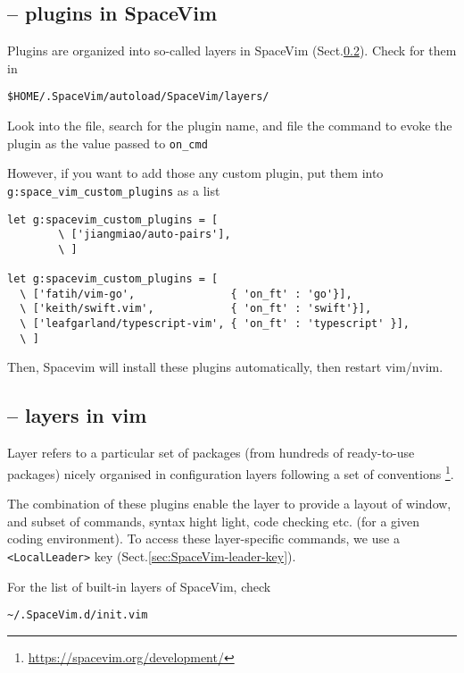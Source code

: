 \subsection{ -- plugins in SpaceVim}

Plugins are organized into so-called layers in SpaceVim
(Sect.\ref{sec:nvim-layers}). Check for them in 
\begin{verbatim}
$HOME/.SpaceVim/autoload/SpaceVim/layers/
\end{verbatim}
Look into the file, search for the plugin name, and file the command to evoke
the plugin as the value passed to \verb!on_cmd!

However, if you want to add those any custom plugin, put them into 
\verb!g:space_vim_custom_plugins! as a list
\begin{verbatim}
let g:spacevim_custom_plugins = [
        \ ['jiangmiao/auto-pairs'],
        \ ]
        
let g:spacevim_custom_plugins = [
  \ ['fatih/vim-go',               { 'on_ft' : 'go'}],
  \ ['keith/swift.vim',            { 'on_ft' : 'swift'}],
  \ ['leafgarland/typescript-vim', { 'on_ft' : 'typescript' }],
  \ ]        
\end{verbatim}
Then, Spacevim will install these plugins automatically, then restart
vim/nvim.




\subsection{-- layers in vim}
\label{sec:nvim-layers}

Layer refers to a particular set of packages (from hundreds of ready-to-use
packages) nicely organised in configuration layers following a set of
conventions \footnote{\url{https://spacevim.org/development/}}.

The combination of these plugins enable the layer to provide a layout of window,
and subset of commands, syntax hight light, code checking etc. (for a given
coding environment). To access these layer-specific commands, we use a
\verb!<LocalLeader>! key (Sect.\ref{sec:SpaceVim-leader-key}).

For the list of built-in layers of SpaceVim, check 
\begin{verbatim}
~/.SpaceVim.d/init.vim
\end{verbatim}



